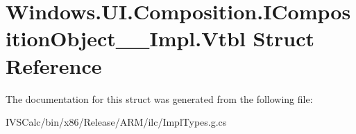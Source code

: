 \hypertarget{struct_windows_1_1_u_i_1_1_composition_1_1_i_composition_object_____impl_1_1_vtbl}{}\section{Windows.\+U\+I.\+Composition.\+I\+Composition\+Object\+\_\+\+\_\+\+Impl.\+Vtbl Struct Reference}
\label{struct_windows_1_1_u_i_1_1_composition_1_1_i_composition_object_____impl_1_1_vtbl}


The documentation for this struct was generated from the following file\+:\begin{DoxyCompactItemize}
\item 
I\+V\+S\+Calc/bin/x86/\+Release/\+A\+R\+M/ilc/Impl\+Types.\+g.\+cs\end{DoxyCompactItemize}
